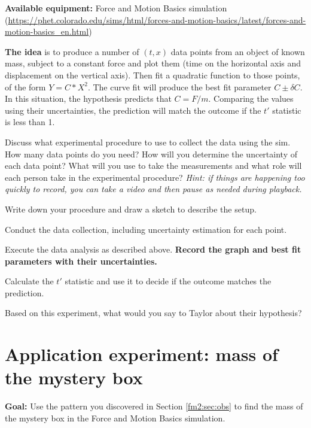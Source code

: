 \textbf{Available equipment:} 
Force and Motion Basics simulation (\url{https://phet.colorado.edu/sims/html/forces-and-motion-basics/latest/forces-and-motion-basics_en.html})

\textbf{The idea} is to produce a number of $(t,x)$ data points from an object of known mass, subject to a constant force and plot them (time on the horizontal axis and displacement on the vertical axis). Then fit a quadratic function to those points, of the form $Y = C*X^2$. The curve fit will produce the best fit parameter $C \pm \delta C$. In this situation, the hypothesis predicts that $C = F/m$. Comparing the values using their uncertainties, the prediction will match the outcome if the $t'$ statistic is less than 1.

\begin{steps}
	\item Discuss what experimental procedure to use to collect the data using the sim. How many data points do you need? How will you determine the uncertainty of each data point? What will you use to take the measurements and what role will each person take in the experimental procedure? \textit{Hint: if things are happening too quickly to record, you can take a video and then pause as needed during playback.}
	
	\item Write down your procedure and draw a sketch to describe the setup.
	
	\item Conduct the data collection, including uncertainty estimation for each point.
	
	\item Execute the data analysis as described above. \textbf{Record the graph and best fit parameters with their uncertainties.}
	
	\item Calculate the $t'$ statistic and use it to decide if the outcome matches the prediction.
	
	\item Based on this experiment, what would you say to Taylor about their hypothesis?
\end{steps}

\section{Application experiment: mass of the mystery box}

\textbf{Goal:} Use the pattern you discovered in Section \ref{fm2:sec:obs} to find the mass of the mystery box in the Force and Motion Basics simulation.

